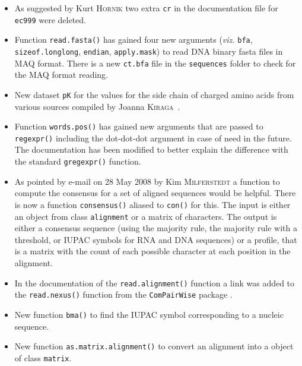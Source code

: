 \documentclass{article}
\begin{document}
\begin{itemize}

\item As suggested by Kurt \textsc{Hornik} two extra \texttt{cr} in the
  documentation file for \texttt{ec999} were deleted.

\item Function \texttt{read.fasta()} has gained four new arguments
  (\textit{viz.} \texttt{bfa}, \texttt{sizeof.longlong},
  \texttt{endian}, \texttt{apply.mask}) to read DNA binary fasta
  files in MAQ format. There is a new \texttt{ct.bfa} file
  in the \texttt{sequences} folder to check for the MAQ format
  reading.

\item New dataset \texttt{pK} for the values for the side chain of charged amino acids from various sources compiled by Joanna \textsc{Kiraga}~\cite{KiragaJ2008}.

\item Function \texttt{words.pos()} has gained new arguments that
  are passed to \texttt{regexpr()} including the dot-dot-dot
  argument in case of need in the future. The documentation has
  been modified to better explain the difference with the standard
  \texttt{gregexpr()} function.

\item As pointed by e-mail on 28 May 2008 by Kim \textsc{Milferstedt} a
  function to compute the consensus for a set of aligned sequences
  would be helpful. There is now a function \texttt{consensus()}
  aliased to \texttt{con()} for this. The input is either an object
  from class \texttt{alignment} or a matrix of characters. The
  output is either a consensus sequence (using the majority rule,
  the majority rule with a threshold, or IUPAC symbols for RNA
  and DNA sequences) or a profile, that is a matrix with the count
  of each possible character at each position in the alignment.

\item In the documentation of the \texttt{read.alignment()} function
  a link was added to the \texttt{read.nexus()} function from the
  \texttt{ComPairWise} package \cite{ComPairWise}.

\item New function \texttt{bma()} to find the IUPAC symbol corresponding
  to a nucleic sequence.

\item New function \texttt{as.matrix.alignment()} to convert an
  alignment into a object of class \texttt{matrix}.


\end{itemize}
\end{document}
